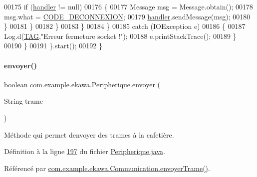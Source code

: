 \begin{DoxyCode}
00175                             \textcolor{keywordflow}{if} (\hyperlink{classcom_1_1example_1_1ekawa_1_1_peripherique_ab6a0c0cae2eb087315d0d04d1cf6c3dc}{handler} != null)
00176                             \{
00177                                 Message msg = Message.obtain();
00178                                 msg.what = \hyperlink{classcom_1_1example_1_1ekawa_1_1_peripherique_a99f0e30a113d64b30598c6305657dcee}{CODE\_DECONNEXION};
00179                                 \hyperlink{classcom_1_1example_1_1ekawa_1_1_peripherique_ab6a0c0cae2eb087315d0d04d1cf6c3dc}{handler}.sendMessage(msg);
00180                             \}
00181                         \}
00182                     \}
00183                 \}
00184             \}
00185             \textcolor{keywordflow}{catch} (IOException e)
00186             \{
00187                 Log.d(\hyperlink{classcom_1_1example_1_1ekawa_1_1_peripherique_a80ad0e52c530c7dc114109ff777ae975}{TAG},\textcolor{stringliteral}{"Erreur fermeture socket !"});
00188                 e.printStackTrace();
00189             \}
00190             \}
00191         \}.start();
00192     \}
\end{DoxyCode}
\mbox{\label{classcom_1_1example_1_1ekawa_1_1_peripherique_ac1361bc1a445b00c4c7ebb56dfee274d}} 
\paragraph{\texorpdfstring{envoyer()}{envoyer()}}
{\footnotesize\ttfamily boolean com.\+example.\+ekawa.\+Peripherique.\+envoyer (\begin{DoxyParamCaption}\item[{String}]{trame }\end{DoxyParamCaption})}



Méthode qui permet d\textquotesingle{}envoyer des trames à la cafetière. 



Définition à la ligne \hyperlink{_peripherique_8java_source_l00197}{197} du fichier \hyperlink{_peripherique_8java_source}{Peripherique.\+java}.



Référencé par \hyperlink{_communication_8java_source_l00309}{com.\+example.\+ekawa.\+Communication.\+envoyer\+Trame()}.



